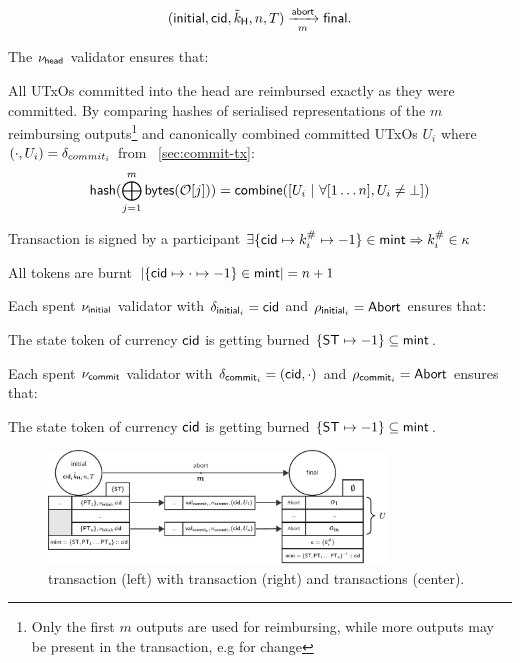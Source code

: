 \[
   (\mathsf{initial},\mathsf{cid},\tilde{k}_{\mathsf{H}},n,T) \xrightarrow[m]{\mathsf{abort}} \mathsf{final}.
\]

\begin{samepage}
\noindent The $\nu_\mathsf{head}$ validator ensures that:
\begin{menumerate}
  \item All UTxOs committed into the head are reimbursed exactly as they were
  committed. By comparing hashes of serialised representations of the $m$
  reimbursing outputs\footnote{Only the first $m$ outputs are used for
    reimbursing, while more outputs may be present in the transaction, e.g for
    change} and canonically combined committed UTxOs $U_{i}$ where $(\cdot, U_{i}) = \delta_{commit_{i}}$ from \mtxCom{}~\ref{sec:commit-tx}:
  \[
    \mathsf{hash}(\bigoplus_{j=1}^{m} \mathsf{bytes}(\mathcal{O}[j])) = \mathsf{combine}([U_{i} ~ | ~ \forall [1\dots n], U_{i} \neq \bot])
  \]

  \item Transaction is signed by a participant $\exists \{\mathsf{cid} \mapsto k^{\#}_{i} \mapsto -1\} \in \mathsf{mint} \Rightarrow k^{\#}_{i} \in \kappa$
  \item All tokens are burnt
  $|\{\mathsf{cid} \mapsto \cdot \mapsto -1\} \in \mathsf{mint}| = n + 1$
\end{menumerate}
\end{samepage}

\noindent Each spent $\nu_{\mathsf{initial}}$ validator with $\delta_{\mathsf{initial}_{i}} = \mathsf{cid}$ and $\rho_{\mathsf{initial}_{i}} = \mathsf{Abort}$ ensures that:
\begin{menumerate}
  \item The state token of currency $\mathsf{cid}$ is getting burned $\{\mathsf{ST} \mapsto -1\} \subseteq \mathsf{mint}$.
\end{menumerate}

\noindent Each spent $\nu_{\mathsf{commit}}$ validator with $\delta_{\mathsf{commit}_{i}} = (\mathsf{cid},\cdot)$ and $\rho_{\mathsf{commit}_{i}} = \mathsf{Abort}$ ensures that:
\begin{menumerate}
  \item The state token of currency $\mathsf{cid}$ is getting burned $\{\mathsf{ST} \mapsto -1\} \subseteq \mathsf{mint}$.
\end{menumerate}

\begin{figure}[h]
  \centering
  \includegraphics[width=0.8\textwidth]{figures/SM-abort.pdf}
  \caption{\mtxInit{} transaction (left) with \mtxAbort{} transaction (right)
    and \mtxCom{} transactions (center).}\label{fig:SM-abort}
\end{figure}

